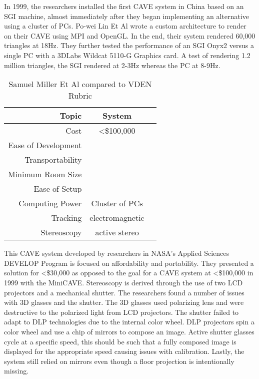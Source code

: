 In 1999, the researchers installed the first CAVE system in China based on an SGI machine, almost immediately after they began implementing an alternative using a cluster of PCs. Po-wei Lin Et Al wrote a custom architecture to render on their CAVE using MPI and OpenGL. In the end, their system rendered 60,000 triangles at 18Hz. They further tested the performance of an SGI Onyx2 versus a single PC with a 3DLabs Wildcat 5110-G Graphics card. A test of rendering 1.2 million triangles, the SGI rendered at 2-3Hz whereas the PC at 8-9Hz.


\filbreak
{}

\begin{table}[H]
	\centering
	\renewcommand\arraystretch{0.5}
	\begin{tabular}{r|c|c}
		\hline 
		Topic & System &  \\ 
		\hline 
		Cost 				& \textless \$100,000 	& \cross \\ 
		Ease of Development & \ns 					& \cross \\ 
		Transportability 	& \ns  					& \cross \\ 
		Minimum Room Size 	& \ns 					& \cross \\ 
		Ease of Setup 		& \ns 					& \cross \\ 
		Computing Power 	& Cluster of PCs 		& \cross \\ 
		Tracking 			& electromagnetic 		& \cross \\ 
		Stereoscopy 		& active stereo 		& \checkmark \\ 
		\hline 
	\end{tabular} 
	
	\caption{Samuel Miller Et Al compared to VDEN Rubric} \label{tab:millerRubric}
\end{table}

This CAVE system developed by researchers in NASA's Applied Sciences DEVELOP Program is focused on affordability and portability. They presented a solution for \textless\$30,000 as opposed to the goal for a CAVE system at \textless\$100,000 in 1999 with the MiniCAVE. Stereoscopy is derived through the use of two LCD projectors and a mechanical shutter. The researchers found a number of issues with 3D glasses and the shutter. The 3D glasses used polarizing lens and were destructive to the polarized light from LCD projectors. The shutter failed to adapt to DLP technologies due to the internal color wheel. DLP projectors spin a color wheel and use a chip of mirrors to compose an image. Active shutter glasses cycle at a specific speed, this should be such that a fully composed image is displayed for the appropriate speed causing issues with calibration. Lastly, the system still relied on mirrors even though a floor projection is intentionally missing. 



